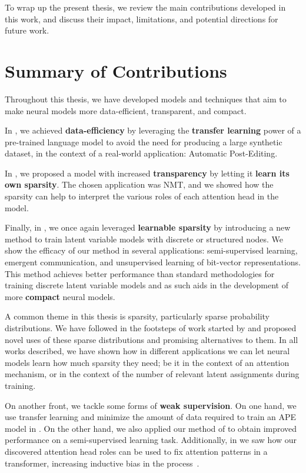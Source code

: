 \label{chap:conclusions}

\cleardoublepage
\doublespacing

\noindent To wrap up the present thesis, we review the main contributions
developed in this work, and discuss their impact, limitations, and
potential directions for future work.

\section{Summary of Contributions}

\noindent Throughout this thesis, we have developed models and
techniques that aim to make neural models more data-efficient, transparent,
and compact.

In , we achieved \textbf{data-efficiency} by
leveraging the \textbf{transfer learning} power of a pre-trained
language model to avoid the need for producing a large synthetic
dataset, in the context of a real-world application: Automatic
Post-Editing.

In , we proposed a model with increased
\textbf{transparency} by letting it \textbf{learn its own sparsity}.
The chosen application was NMT, and we showed
how the sparsity can help to interpret the various roles of each
attention head in the model.

Finally, in , we once again leveraged
\textbf{learnable sparsity} by introducing a new method to train
latent variable models with discrete or structured nodes. We show the
efficacy of our method in several applications: semi-supervised
learning, emergent communication, and unsupervised learning of
bit-vector representations. This method achieves better performance
than standard methodologies for training discrete latent variable
models and as such aids in the development of more \textbf{compact}
neural models.

A common theme in this thesis is sparsity, particularly
sparse probability distributions. We have followed in the footsteps
of work started by \citet{sparsemax} and proposed novel uses of
these sparse distributions and promising alternatives to them.
In all works described, we have shown how in different applications
we can let neural models learn how much sparsity they need; be it
in the context of an attention mechanism, or in the context of
the number of relevant latent assignments during training.

On another front, we tackle some forms of \textbf{weak supervision}.
On one hand, we use transfer learning and minimize the amount of data
required to train an APE model in . On the other
hand, we also applied our method of  to
obtain improved performance on a semi-supervised learning task.
Additionally, in  we saw how our
discovered attention head roles can be used to fix attention patterns
in a transformer, increasing inductive bias in the
process~\citep{raganato2020FixedEncoderSelfAttention}.

